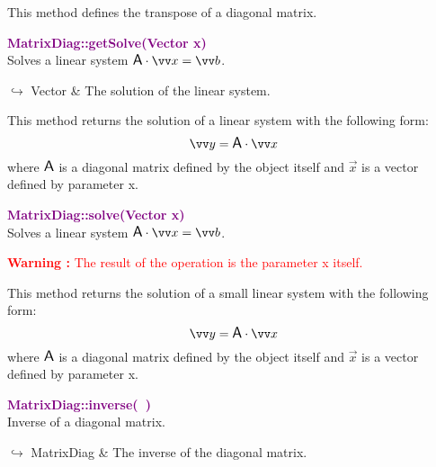 This method defines the transpose of a diagonal matrix.

\textcolor{purple}{\textbf{MatrixDiag::getSolve(Vector x)}}\label{MatrixDiag::getSolve(Vector x)}\\
Solves a linear system $\A\cdot \overrightarrow{x} = \overrightarrow{b}$.\vspace*{-0.5em}
\begin{tcolorbox}[grow to left by=-1cm, width=\textwidth-1cm,myArgs,tabularx={l|R}]
$\hookrightarrow$ Vector & The solution of the linear system.
\end{tcolorbox}

This method returns the solution of a linear system with the following form:
\begin{equation*}
\overrightarrow{y} = \A \cdot \overrightarrow{x}
\end{equation*}
where $\mbox{\large\ensuremath{\mathsf{A}}}$ is a diagonal matrix defined by the object itself and $\overrightarrow{x}$ is a vector defined by parameter x.

\textcolor{purple}{\textbf{MatrixDiag::solve(Vector x)}}\label{MatrixDiag::solve(Vector x)}\\
Solves a linear system $\A\cdot \overrightarrow{x} = \overrightarrow{b}$.

\hspace*{10mm}\textcolor{red}{\textbf{Warning :}  The result of the operation is the parameter x itself.}

This method returns the solution of a small linear system with the following form:
\begin{equation*}
\overrightarrow{y} = \A \cdot \overrightarrow{x}
\end{equation*}
where $\mbox{\large\ensuremath{\mathsf{A}}}$ is a diagonal matrix defined by the object itself and $\overrightarrow{x}$ is a vector defined by parameter x.

\textcolor{purple}{\textbf{MatrixDiag::inverse(~)}}\label{MatrixDiag::inverse()}\\
Inverse of a diagonal matrix.\vspace*{-0.5em}
\begin{tcolorbox}[grow to left by=-1cm, width=\textwidth-1cm,myArgs,tabularx={l|R}]
$\hookrightarrow$ MatrixDiag & The inverse of the diagonal matrix.
\end{tcolorbox}

